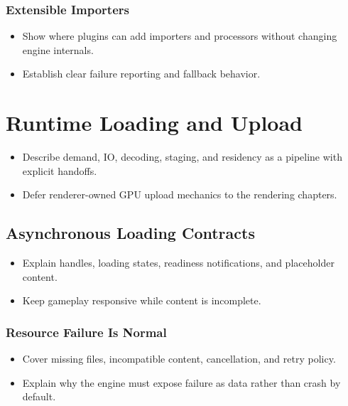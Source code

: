 \documentclass[
  11pt,
  letterpaper,
  DIV=11,
  numbers=noendperiod,
  twoside,
  open=right]{scrreprt}
\providecommand{\tightlist}{%
  \setlength{\itemsep}{0pt}\setlength{\parskip}{0pt}}
\begin{document}
\subsubsection{Extensible Importers}\label{extensible-importers}

\begin{itemize}
\tightlist
\item
  Show where plugins can add importers and processors without changing
  engine internals.
\item
  Establish clear failure reporting and fallback behavior.
\end{itemize}

\section{Runtime Loading and Upload}\label{runtime-loading-and-upload}

\begin{itemize}
\tightlist
\item
  Describe demand, IO, decoding, staging, and residency as a pipeline
  with explicit handoffs.
\item
  Defer renderer-owned GPU upload mechanics to the rendering chapters.
\end{itemize}

\subsection{Asynchronous Loading
Contracts}\label{asynchronous-loading-contracts}

\begin{itemize}
\tightlist
\item
  Explain handles, loading states, readiness notifications, and
  placeholder content.
\item
  Keep gameplay responsive while content is incomplete.
\end{itemize}

\subsubsection{Resource Failure Is
Normal}\label{resource-failure-is-normal}

\begin{itemize}
\tightlist
\item
  Cover missing files, incompatible content, cancellation, and retry
  policy.
\item
  Explain why the engine must expose failure as data rather than crash
  by default.
\end{itemize}
\end{document}
